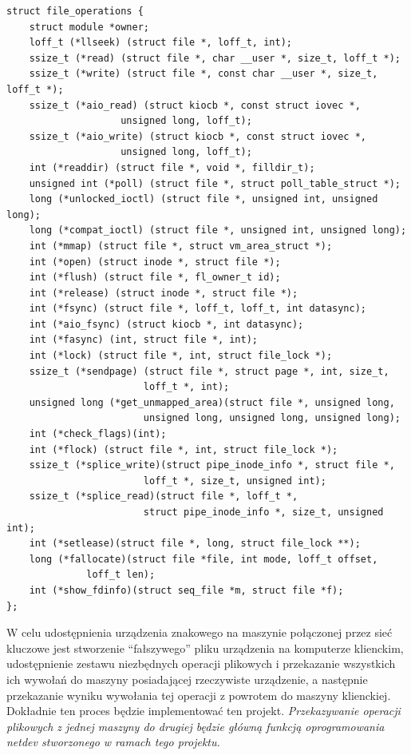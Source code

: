 \documentclass[11pt]{scrartcl}
\begin{document}
\begin{verbatim}
struct file_operations {
    struct module *owner;
    loff_t (*llseek) (struct file *, loff_t, int);
    ssize_t (*read) (struct file *, char __user *, size_t, loff_t *);
    ssize_t (*write) (struct file *, const char __user *, size_t, loff_t *);
    ssize_t (*aio_read) (struct kiocb *, const struct iovec *,
                    unsigned long, loff_t);
    ssize_t (*aio_write) (struct kiocb *, const struct iovec *,
                    unsigned long, loff_t);
    int (*readdir) (struct file *, void *, filldir_t);
    unsigned int (*poll) (struct file *, struct poll_table_struct *);
    long (*unlocked_ioctl) (struct file *, unsigned int, unsigned long);
    long (*compat_ioctl) (struct file *, unsigned int, unsigned long);
    int (*mmap) (struct file *, struct vm_area_struct *);
    int (*open) (struct inode *, struct file *);
    int (*flush) (struct file *, fl_owner_t id);
    int (*release) (struct inode *, struct file *);
    int (*fsync) (struct file *, loff_t, loff_t, int datasync);
    int (*aio_fsync) (struct kiocb *, int datasync);
    int (*fasync) (int, struct file *, int);
    int (*lock) (struct file *, int, struct file_lock *);
    ssize_t (*sendpage) (struct file *, struct page *, int, size_t,
                        loff_t *, int);
    unsigned long (*get_unmapped_area)(struct file *, unsigned long,
                        unsigned long, unsigned long, unsigned long);
    int (*check_flags)(int);
    int (*flock) (struct file *, int, struct file_lock *);
    ssize_t (*splice_write)(struct pipe_inode_info *, struct file *,
                        loff_t *, size_t, unsigned int);
    ssize_t (*splice_read)(struct file *, loff_t *,
                        struct pipe_inode_info *, size_t, unsigned int);
    int (*setlease)(struct file *, long, struct file_lock **);
    long (*fallocate)(struct file *file, int mode, loff_t offset,
              loff_t len);
    int (*show_fdinfo)(struct seq_file *m, struct file *f);
};
\end{verbatim}

W celu udostępnienia urządzenia znakowego na maszynie połączonej przez sieć kluczowe jest stworzenie ``fałszywego'' pliku urządzenia na komputerze klienckim, udostępnienie zestawu niezbędnych operacji plikowych i przekazanie wszystkich ich wywołań do maszyny posiadającej rzeczywiste urządzenie, a następnie przekazanie wyniku wywołania tej operacji z powrotem do maszyny klienckiej. Dokładnie ten proces będzie implementować ten projekt. \emph{Przekazywanie operacji plikowych z jednej maszyny do drugiej będzie główną funkcją oprogramowania netdev stworzonego w ramach tego projektu.}
\end{document}
